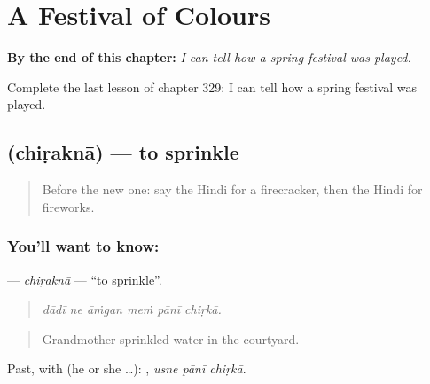 
\chapter{A Festival of Colours}
\label{ch:hi-a-festival-of-colours}

\begin{chapteropening}
\textbf{By the end of this chapter:} \emph{I can tell how a spring festival was played.}

Complete the last lesson of chapter 329: I can tell how a spring festival was played.
\end{chapteropening}

\section[\texorpdfstring{\hi{छिड़कना} (chiṛaknā)}{छिड़कना (chiṛaknā)}]{ (chiṛaknā) — to sprinkle}

\label{lesson:HI-C329-chirakna}



\begin{quote}
Before the new one: say the Hindi for a firecracker, then the Hindi for fireworks.
\end{quote}

\subsection*{You'll want to know: }
\textbf{} — \emph{chiṛaknā} — \textquotedblleft{}to sprinkle\textquotedblright{}.

\begin{quote}
     
\end{quote}

\begin{quote}
\emph{dādī ne āṁgan meṁ pānī chiṛkā.}
\end{quote}

\begin{quote}
Grandmother sprinkled water in the courtyard.
\end{quote}

Past, with  (he or she …):   , \emph{usne pānī chiṛkā}.

